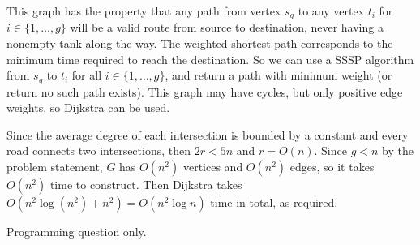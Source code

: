 \documentclass[12pt,twoside]{article}
\begin{document}
\begin{problems}
This graph has the property that any path from vertex $s_g$ to any vertex $t_i$ for $i \in \{1,\ldots,g\}$ will be a valid route from source to destination, never having a nonempty tank along the way. The weighted shortest path corresponds to the minimum time required to reach the destination. So we can use a SSSP algorithm from $s_g$ to $t_i$ for all $i \in \{1,\ldots,g\}$, and return a path with minimum weight (or return no such path exists). This graph may have cycles, but only positive edge weights, so Dijkstra can be used.

Since the average degree of each intersection is bounded by a constant and every road connects two intersections, then $2r<5n$ and $r=O(n)$. Since $g<n$ by the problem statement, $G$ has $O(n^2)$ vertices and $O(n^2)$ edges, so it takes $O(n^2)$ time to construct. Then Dijkstra takes $O(n^2\log (n^2)+n^2)=O(n^2\log n)$ time in total, as required.

\newpage
\problem  %
Programming question only.

\end{problems}
\end{document}
